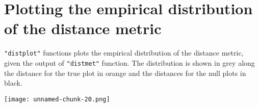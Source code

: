 \section{Plotting the empirical distribution of the distance
metric}\label{plotting-the-empirical-distribution-of-the-distance-metric}

\texttt{"distplot"} functions plots the empirical distribution of the
distance metric, given the output of \texttt{"distmet"} function. The
distribution is shown in grey along the distance for the true plot in
orange and the distances for the null plots in black.

\begin{Shaded}
\begin{Highlighting}[]
\end{Highlighting}
\end{Shaded}

\begin{figure*}[hbtp]
\begin{center}
\texttt{[image: unnamed-chunk-20.png]}
\end{center}
\end{figure*}
